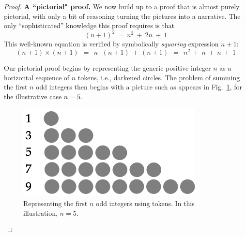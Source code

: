 \begin{proof}
{\bf A ``pictorial" proof.}
We now build up to a proof that is almost purely pictorial, with only a bit of reasoning turning the pictures into a narrative.  The only ``sophisticated'' knowledge this proof requires is that
\begin{equation}
\label{eq:(n+1)^2}
(n+1)^2 \ = \ n^2 \ + \ 2n \ + \ 1
\end{equation}
This well-known equation is verified by symbolically {\em squaring} expression $n+1$:
\[ (n+1) \times (n+1) \ \ = \ \ n \cdot (n+1) \ + \ (n+1) 
     \ \ = \ \ n^2 \ + \ n \ + \ n \ + \ 1
\]

\medskip

\noindent {}

\medskip

Our pictorial proof begins by representing the generic positive integer $n$ as a horizontal sequence of $n$ tokens, i.e., darkened circles.  The problem of summing the first $n$ odd integers then begins with a picture such as appears in Fig.~\ref{fig:sumOdds1}, for the illustrative case $n=5$.
\begin{figure}[htb]
\begin{center}
       \includegraphics[scale=0.4]{FiguresMaths/SumOddsBasis}
\caption{Representing the first $n$ odd integers using tokens.  In this illustration, $n=5$.}
       \label{fig:sumOdds1}
\end{center}
\end{figure}


\end{proof}
